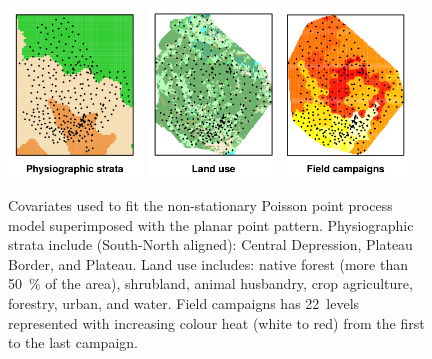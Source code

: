 \begin{figure}[!h]
\centering
\includegraphics[width=0.32\textwidth]{fig/chap07-covarsA}
\includegraphics[width=0.305\textwidth]{fig/chap07-covarsB}
\includegraphics[width=0.3\textwidth]{fig/chap07-covarsC}
\caption[Covariates used to fit the non-stationary Poisson point process model.]{Covariates used to fit the 
non-stationary Poisson point process model superimposed with the planar point pattern. Physiographic strata 
include (South-North aligned): Central Depression, Plateau Border, and Plateau. Land use includes: native 
forest (more than \SI{50}{\percent} of the area), shrubland, animal husbandry, crop agriculture, forestry, 
urban, and water. Field campaigns has \num{22}~levels represented with increasing colour heat (white to red) 
from the first to the last campaign.}
\label{fig:chap07-covars}
\end{figure}

